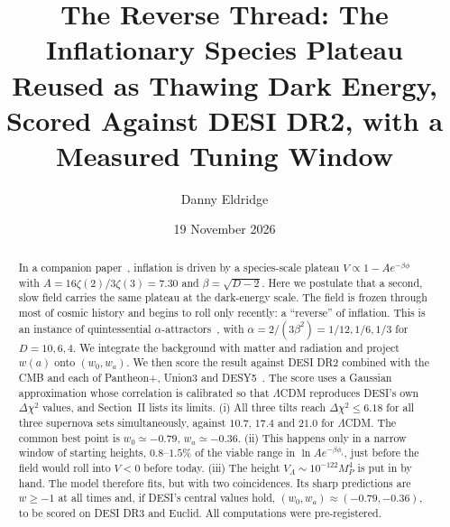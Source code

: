 \documentclass[aps,prd,twocolumn,superscriptaddress,nofootinbib,showkeys]{revtex4-2}
\begin{document}
\title{The Reverse Thread: The Inflationary Species Plateau Reused as Thawing Dark Energy, Scored Against DESI DR2, with a Measured Tuning Window}
\author{Danny Eldridge}
\date{19 November 2026}
\begin{abstract}
In a companion paper~\cite{P1}, inflation is driven by a species-scale plateau $V\propto1-Ae^{-\beta\phi}$ with $A=16\zeta(2)/3\zeta(3)=7.30$ and $\beta=\sqrt{D-2}$. Here we postulate that a second, slow field carries the same plateau at the dark-energy scale. The field is frozen through most of cosmic history and begins to roll only recently: a ``reverse'' of inflation. This is an instance of quintessential $\alpha$-attractors~\cite{L15,AKLV,BMS}, with $\alpha=2/(3\beta^2)=1/12,1/6,1/3$ for $D=10,6,4$. We integrate the background with matter and radiation and project $w(a)$ onto $(w_0,w_a)$. We then score the result against DESI DR2 combined with the CMB and each of Pantheon+, Union3 and DESY5~\cite{DESI}. The score uses a Gaussian approximation whose correlation is calibrated so that $\Lambda$CDM reproduces DESI's own $\Delta\chi^2$ values, and Section~II lists its limits.
(i) All three tilts reach $\Delta\chi^2\le6.18$ for all three supernova sets simultaneously, against $10.7$, $17.4$ and $21.0$ for $\Lambda$CDM. The common best point is $w_0\simeq-0.79$, $w_a\simeq-0.36$.
(ii) This happens only in a narrow window of starting heights, $0.8$--$1.5\%$ of the viable range in $\ln A e^{-\beta\phi_i}$, just before the field would roll into $V<0$ before today.
(iii) The height $V_\Lambda\sim10^{-122}M_P^4$ is put in by hand.
The model therefore fits, but with two coincidences. Its sharp predictions are $w\ge-1$ at all times and, if DESI's central values hold, $(w_0,w_a)\approx(-0.79,-0.36)$, to be scored on DESI DR3 and Euclid. All computations were pre-registered.
\end{abstract}
\maketitle
\end{document}
